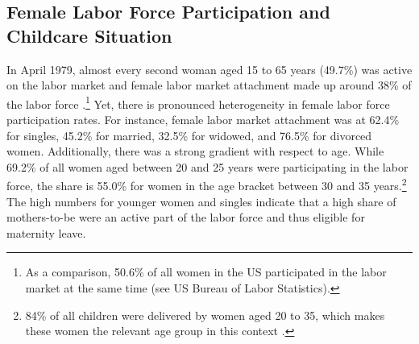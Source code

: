 \documentclass[11pt, a4paper,draft]{article} %
\begin{document}
\subsection{Female Labor Force Participation and Childcare Situation}
In April 1979, almost every second woman aged 15 to 65 years (49.7\%) was active on the labor market and female labor market attachment made up around 38\% of the labor force \citep{federalstatisticaloffice1981yearbook}.\footnote{As a comparison, 50.6\% of all women in the US participated in the labor market at the same time (see US Bureau of Labor Statistics).} Yet, there is pronounced heterogeneity in female labor force participation rates. For instance, female labor market attachment was at 62.4\% for singles, 45.2\% for married, 32.5\% for widowed, and 76.5\% for divorced women. Additionally, there was a strong gradient with respect to age. While 69.2\% of all women aged between 20 and 25 years were participating in the labor force, the share is 55.0\% for women in the age bracket between 30 and 35 years.\footnote{84\% of all children were delivered by
women aged 20 to 35, which makes these women the relevant age group in this context \citep{federalstatisticaloffice1981yearbook}.} The high numbers for younger women and singles indicate that a high share of mothers-to-be were an active part of the labor force and thus eligible for maternity leave. \newline 
\end{document}
